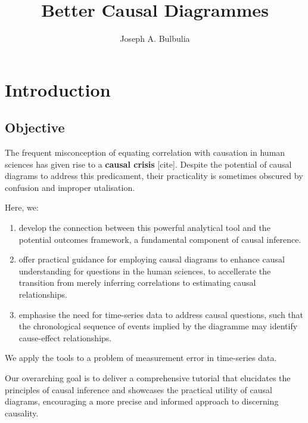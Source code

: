 \documentclass[
  singlecolumn]{report}
\title{Better Causal Diagrammes}
\author{Joseph A. Bulbulia}
\date{}
\begin{document}
\maketitle
\ifdefined\Shaded\renewenvironment{Shaded}{\begin{tcolorbox}[interior hidden, breakable, sharp corners, enhanced, frame hidden, boxrule=0pt, borderline west={3pt}{0pt}{shadecolor}]}{\end{tcolorbox}}\fi

\listoffigures
\listoftables
\hypertarget{introduction}{%
\section{Introduction}\label{introduction}}

\hypertarget{objective}{%
\subsection{Objective}\label{objective}}

The frequent misconception of equating correlation with causation in
human sciences has given rise to a \textbf{causal crisis} {[}cite{]}.
Despite the potential of causal diagrams to address this predicament,
their practicality is sometimes obscured by confusion and improper
utalisation.

Here, we:

\begin{enumerate}
\def\labelenumi{\arabic{enumi}.}
\item
  develop the connection between this powerful analytical tool and the
  potential outcomes framework, a fundamental component of causal
  inference.
\item
  offer practical guidance for employing causal diagrams to enhance
  causal understanding for questions in the human sciences, to
  accellerate the transition from merely inferring correlations to
  estimating causal relationships.
\item
  emphasise the need for time-series data to address causal questions,
  such that the chronological sequence of events implied by the
  diagramme may identify cause-effect relationships.
\end{enumerate}

We apply the tools to a problem of measurement error in time-series
data.

Our overarching goal is to deliver a comprehensive tutorial that
elucidates the principles of causal inference and showcases the
practical utility of causal diagrams, encouraging a more precise and
informed approach to discerning causality.
\end{document}
